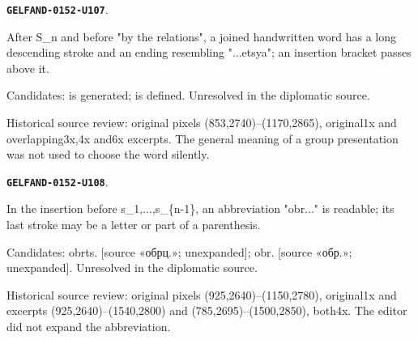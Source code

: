 \documentclass[11pt]{article}
\theoremstyle{definition}
\theoremstyle{remark}
\begin{document}
\par\noindent\leavevmode{}\label{GELFAND-0152-U107}\label{GELFAND-P001395:symmetric-group-predicate:note}\textbf{\texttt{GELFAND-0152-U107}}.\nopagebreak[4]\par
After S\_n and before "by the relations", a joined handwritten word has a long descending stroke and an ending resembling "...etsya"; an insertion bracket passes above it.\par
Candidates: is generated; is defined. Unresolved in the diplomatic source.\par
Historical source review: original pixels (853,2740)–(1170,2865), original1x and overlapping3x,4x and6x excerpts. The general meaning of a group presentation was not used to choose the word silently.\par\medskip
\par\noindent\leavevmode{}\label{GELFAND-0152-U108}\label{GELFAND-P001395:group-generator-abbreviation:note}\textbf{\texttt{GELFAND-0152-U108}}.\nopagebreak[4]\par
In the insertion before s\_1,...,s\_\{n-1\}, an abbreviation "obr..." is readable; its last stroke may be a letter or part of a parenthesis.\par
Candidates: obrts. [source «обрц.»; unexpanded]; obr. [source «обр.»; unexpanded]. Unresolved in the diplomatic source.\par
Historical source review: original pixels (925,2640)–(1150,2780), original1x and excerpts (925,2640)–(1540,2800) and (785,2695)–(1500,2850), both4x. The editor did not expand the abbreviation.\par\medskip
\end{document}
